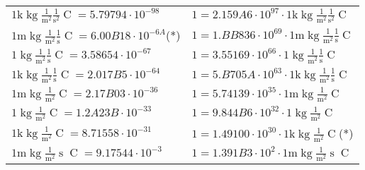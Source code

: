 \begin{center}
\begin{longtable}{l l}
{\color{gray}$1 \bm{\mathrm{ k}}\operatorname{kg}\frac1{\operatorname{m}^2}\frac1{\operatorname{s}^2}{\operatorname{C}}{} = 5.79794\cdot10^{-98} $}   & {\color{gray}$ 1 = 2.159A6\cdot10^{97} \cdot 1 \bm{\mathrm{ k}}\operatorname{kg}\frac1{\operatorname{m}^2}\frac1{\operatorname{s}^2}{\operatorname{C}}{}$}  \\
{\color{gray}$1 \bm{\mathrm{ m}}\operatorname{kg}\frac1{\operatorname{m}^2}\frac1{\operatorname{s}}{\operatorname{C}}{} = 6.00B18\cdot10^{-6A} $}\quad(*) & {\color{gray}$ 1 = 1.BB836\cdot10^{69} \cdot 1 \bm{\mathrm{ m}}\operatorname{kg}\frac1{\operatorname{m}^2}\frac1{\operatorname{s}}{\operatorname{C}}{}$}  \\
{\color{black}$1 \bm{\mathrm{ }}\operatorname{kg}\frac1{\operatorname{m}^2}\frac1{\operatorname{s}}{\operatorname{C}}{} = 3.58654\cdot10^{-67} $}   & {\color{black}$ 1 = 3.55169\cdot10^{66} \cdot 1 \bm{\mathrm{ }}\operatorname{kg}\frac1{\operatorname{m}^2}\frac1{\operatorname{s}}{\operatorname{C}}{}$}  \\
{\color{gray}$1 \bm{\mathrm{ k}}\operatorname{kg}\frac1{\operatorname{m}^2}\frac1{\operatorname{s}}{\operatorname{C}}{} = 2.017B5\cdot10^{-64} $}   & {\color{gray}$ 1 = 5.B705A\cdot10^{63} \cdot 1 \bm{\mathrm{ k}}\operatorname{kg}\frac1{\operatorname{m}^2}\frac1{\operatorname{s}}{\operatorname{C}}{}$}  \\
{\color{gray}$1 \bm{\mathrm{ m}}\operatorname{kg}\frac1{\operatorname{m}^2}{}{\operatorname{C}}{} = 2.17B03\cdot10^{-36} $}   & {\color{gray}$ 1 = 5.74139\cdot10^{35} \cdot 1 \bm{\mathrm{ m}}\operatorname{kg}\frac1{\operatorname{m}^2}{}{\operatorname{C}}{}$}  \\
{\color{black}$1 \bm{\mathrm{ }}\operatorname{kg}\frac1{\operatorname{m}^2}{}{\operatorname{C}}{} = 1.2A23B\cdot10^{-33} $}   & {\color{black}$ 1 = 9.844B6\cdot10^{32} \cdot 1 \bm{\mathrm{ }}\operatorname{kg}\frac1{\operatorname{m}^2}{}{\operatorname{C}}{}$}  \\
{\color{gray}$1 \bm{\mathrm{ k}}\operatorname{kg}\frac1{\operatorname{m}^2}{}{\operatorname{C}}{} = 8.71558\cdot10^{-31} $}   & {\color{gray}$ 1 = 1.49100\cdot10^{30} \cdot 1 \bm{\mathrm{ k}}\operatorname{kg}\frac1{\operatorname{m}^2}{}{\operatorname{C}}{}$}\quad(*)\\
{\color{gray}$1 \bm{\mathrm{ m}}\operatorname{kg}\frac1{\operatorname{m}^2}{\operatorname{s}}{\operatorname{C}}{} = 9.17544\cdot10^{-3} $}   & {\color{gray}$ 1 = 1.391B3\cdot10^{2} \cdot 1 \bm{\mathrm{ m}}\operatorname{kg}\frac1{\operatorname{m}^2}{\operatorname{s}}{\operatorname{C}}{}$}  \\

\end{longtable}
\end{center}
